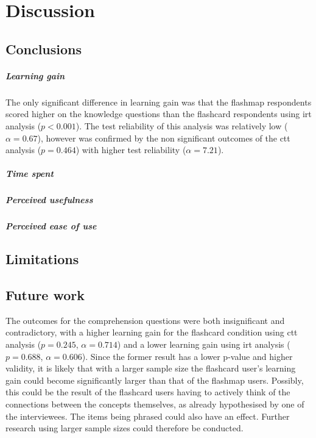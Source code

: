 \chapter{Discussion}
\label{ch:discussion}

\section{Conclusions}

\paragraph{Learning gain} The only significant difference in learning gain was that the flashmap respondents scored higher on the knowledge questions than the flashcard respondents using irt analysis ($p < 0.001$). The test reliability of this analysis was relatively low ($\alpha=0.67$), however was confirmed by the non significant outcomes of the ctt analysis ($p=0.464$) with higher test reliability ($\alpha=7.21$).

\paragraph{Time spent}

\paragraph{Perceived usefulness}

\paragraph{Perceived ease of use}

\section{Limitations}



\section{Future work}

The outcomes for the comprehension questions were both insignificant and contradictory, with a higher learning gain for the flashcard condition using ctt analysis ($p=0.245$, $\alpha=0.714$) and a lower learning gain using irt analysis ($p=0.688$, $\alpha=0.606$). Since the former result has a lower p-value and higher validity, it is likely that with a larger sample size the flashcard user's learning gain could become significantly larger than that of the flashmap users. Possibly, this could be the result of the flashcard users having to actively think of the connections between the concepts themselves, as already hypothesised by one of the interviewees. The items being phrased could also have an effect. Further research using larger sample sizes could therefore be conducted.

